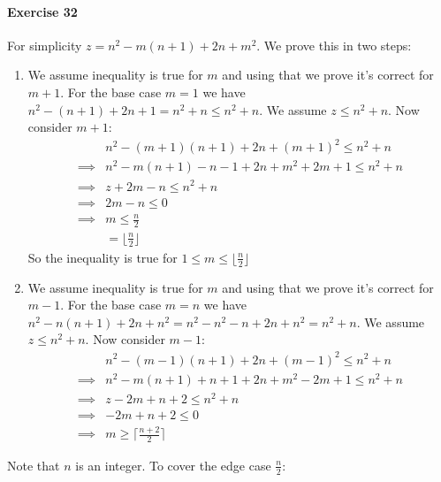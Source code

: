 \documentclass{book}
\begin{document}
	\paragraph{Exercise 32} For simplicity $z = n^2 - m(n + 1) + 2n + m^2$. We prove this in two steps:
	\begin{enumerate}
		\item We assume inequality is true for $m$ and using that we prove it's correct for $m + 1$. For the base case $m = 1$ we have $n^2 -(n + 1) + 2n + 1 = n^2 + n \le n^2 + n$. We assume $z \le n^2 + n$. Now consider $m + 1$:
		\begin{equation*}
			\begin{split}
				&n^2 - (m + 1)(n + 1) + 2n + (m + 1)^2 \le n^2 + n \\
				\implies&n^2 - m(n + 1) - n - 1 + 2n + m^2 + 2m + 1 \le n^2 + n \\
				\implies&z + 2m - n \le n^2 + n \\
				\implies&2m - n \le 0 \\
				\implies&m \le \frac{n}{2} \\
				&= \lfloor \frac{n}{2} \rfloor
			\end{split}
		\end{equation*}
		So the inequality is true for $1 \le m \le \lfloor \frac{n}{2} \rfloor$
		\item We assume inequality is true for $m$ and using that we prove it's correct for $m - 1$. For the base case $m = n$ we have $n^2 - n(n + 1) + 2n + n^2 = n^2 -n^2 - n + 2n + n^2 = n^2 + n$. We assume $z \le n^2 + n$. Now consider $m - 1$:
		\begin{equation*}
			\begin{split}
				&n^2 - (m - 1)(n + 1) + 2n + (m - 1)^2 \le n^2 + n \\
				\implies &n^2 -m(n + 1) + n + 1 + 2n + m^2 - 2m + 1 \le n^2 + n \\
				\implies&z -2m + n + 2 \le n^2 + n \\
				\implies&-2m + n + 2 \le 0 \\
				\implies &m \ge \lceil \frac{n + 2}{2} \rceil
			\end{split}		
		\end{equation*}		
	\end{enumerate}
	Note that $n$ is an integer. To cover the edge case $\frac{n}{2}$:
\end{document}

